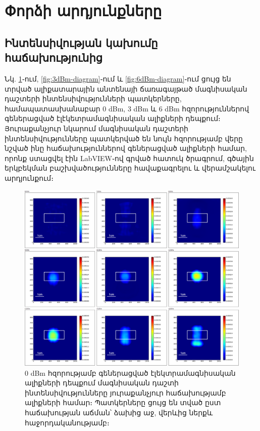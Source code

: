 \documentclass[12pt, fleqn]{report}
\begin{document}
\newpage

\section{Փորձի արդյունքները}
\subsection{Ինտենսիվության կախումը հաճախությունից}  
 Նկ. \ref{fig:0dBm-diagram}֊ում, \ref{fig:3dBm-diagram}֊ում և \ref{fig:6dBm-diagram}֊ում ցույց են տրված ալիքատարային անտենայի ճառագայթած մագնիսական դաշտերի ինտենսիվությունների պատկերները, համապատասխանաբար 0 dBm, 3 dBm և 6 dBm հզորություններով գեներացված էլէկետրամագնիսական ալիքների դեպքում։ Յուրաքանչյուր նկարում մագնիսական դաշտերի ինտենսիվությունները պատկերված են նույն հզորությամբ վերը նշված ինը հաճախություններով գեներացված ալիքների համար, որոնք ստացվել էին LabVIEW֊ով գրված հատուկ ծրագրում, գծային երկբեկման բաշխվածությունները հավաքագրելու և վերամշակելու արդյունքում։
\begin{figure}
    \begin{adjustwidth}{-0.8cm}{}
    \centering
    \includegraphics[width=1.0\linewidth]{data/experiment-results/free field of antenna, 6-14ghz, 0dbm generator output, distance 5mm.png}
    \caption{0 dBm հզորությամբ գեներացված էլեկտրամագնիսական ալիքների դեպքում մագնիսական դաշտի ինտենսիվությունները յուրաքանչյուր հաճախությամբ ալիքների համար։ Պատկերները ցույց են տված ըստ հաճախության աճման՝ ձախից աջ, վերևից ներքև հաջորդականությամբ։}
    \label{fig:0dBm-diagram}
\end{adjustwidth}
\end{figure}
\end{document}
